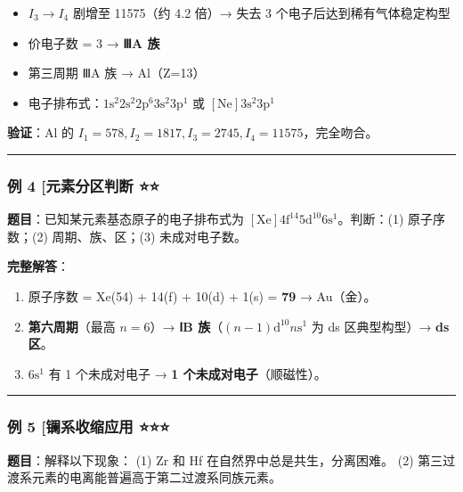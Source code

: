 \documentclass[a4paper,11pt]{ctexart}
\providecommand{\tightlist}{\setlength{\itemsep}{0pt}\setlength{\parskip}{0pt}}
\begin{document}
\begin{itemize}
\tightlist
\item
  \(I_3 \to I_4\) 剧增至 11575（约 4.2 倍）→ 失去 3 个电子后达到稀有气体稳定构型
\item
  价电子数 = 3 → \textbf{ⅢA 族}
\item
  第三周期 ⅢA 族 → Al（Z=13）
\item
  电子排布式：\(1\mathrm{s}^2 2\mathrm{s}^2 2\mathrm{p}^6 3\mathrm{s}^2 3\mathrm{p}^1\) 或 \([\mathrm{Ne}] 3\mathrm{s}^2 3\mathrm{p}^1\)
\end{itemize}

\textbf{验证}：Al 的 \(I_1=578, I_2=1817, I_3=2745, I_4=11575\)，完全吻合。

\begin{center}\rule{0.5\linewidth}{0.5pt}\end{center}

\subsubsection{例 4 {[}元素分区判断 ⭐⭐}\label{ux4f8b-4-ux5143ux7d20ux5206ux533aux5224ux65ad}

\textbf{题目}：已知某元素基态原子的电子排布式为 \([\mathrm{Xe}] 4\mathrm{f}^{14} 5\mathrm{d}^{10} 6\mathrm{s}^1\)。判断：(1) 原子序数；(2) 周期、族、区；(3) 未成对电子数。

\textbf{完整解答}：

\begin{enumerate}
\def\labelenumi{(\arabic{enumi})}
\item
  原子序数 = Xe(54) + 14(f) + 10(d) + 1(s) = \textbf{79} → Au（金）。
\item
  \textbf{第六周期}（最高 \(n=6\)）→ \textbf{ⅠB 族}（\((n-1)\mathrm{d}^{10}n\mathrm{s}^1\) 为 ds 区典型构型）→ \textbf{ds 区}。
\item
  \(6\mathrm{s}^1\) 有 1 个未成对电子 → \textbf{1 个未成对电子}（顺磁性）。
\end{enumerate}

\begin{center}\rule{0.5\linewidth}{0.5pt}\end{center}

\subsubsection{例 5 {[}镧系收缩应用 ⭐⭐⭐}\label{ux4f8b-5-ux9567ux7cfbux6536ux7f29ux5e94ux7528}

\textbf{题目}：解释以下现象：
(1) Zr 和 Hf 在自然界中总是共生，分离困难。
(2) 第三过渡系元素的电离能普遍高于第二过渡系同族元素。
\end{document}
